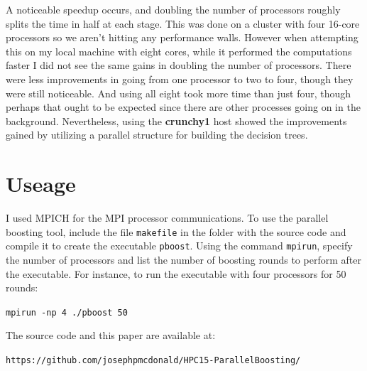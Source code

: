 \documentclass[12pt]{article}
\begin{document}
A noticeable speedup occurs, and doubling the number of processors roughly splits the time in half at each stage. This was done on a cluster with four 16-core processors so we aren't hitting any performance walls. However when attempting this on my local machine with eight cores, while it performed the computations faster I did not see the same gains in doubling the number of processors. There were less improvements in going from one processor to two to four, though they were still noticeable. And using all eight took more time than just four, though perhaps that ought to be expected since there are other processes going on in the background. Nevertheless, using the {\bf crunchy1} host showed the improvements gained by utilizing a parallel structure for building the decision trees.



\section{Useage}
I used MPICH for the MPI processor communications. To use the parallel boosting tool, include the file {\tt makefile} in the folder with the source code and compile it to create the executable {\tt pboost}. Using the command {\tt mpirun}, specify the number of processors and list the number of boosting rounds to perform after the executable. For instance, to run the executable with four processors for 50 rounds:

\begin{center}
{\tt mpirun -np 4 ./pboost 50}
\end{center}

\noindent The source code and this paper are available at:
\begin{center}
{\tt https://github.com/josephpmcdonald/HPC15-ParallelBoosting/}
\end{center}
\end{document}
